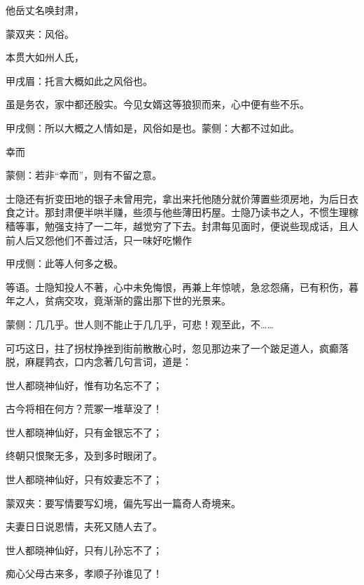 \begin{parag}
    他岳丈名唤封肃，\begin{note}蒙双夹：风俗。\end{note}本贯大如州人氏，\begin{note}甲戌眉：托言大概如此之风俗也。\end{note}虽是务农，家中都还殷实。今见女婿这等狼狈而来，心中便有些不乐。\begin{note}甲戌侧：所以大概之人情如是，风俗如是也。蒙侧：大都不过如此。\end{note}幸而\begin{note}蒙侧：若非“幸而”，则有不留之意。\end{note}士隐还有折变田地的银子未曾用完，拿出来托他随分就价薄置些须房地，为后日衣食之计。那封肃便半哄半赚，些须与他些薄田朽屋。士隐乃读书之人，不惯生理稼穑等事，勉强支持了一二年，越觉穷了下去。封肃每见面时，便说些现成话，且人前人后又怨他们不善过活，只一味好吃懒作\begin{note}甲戌侧：此等人何多之极。\end{note}等语。士隐知投人不著，心中未免悔恨，再兼上年惊唬，急忿怨痛，已有积伤，暮年之人，贫病交攻，竟渐渐的露出那下世的光景来。\begin{note}蒙侧：几几乎。世人则不能止于几几乎，可悲！观至此，不……\end{note}
\end{parag}


\begin{parag}
    可巧这日，拄了拐杖挣挫到街前散散心时，忽见那边来了一个跛足道人，疯癫落脱，麻屣鹑衣，口内念著几句言词，道是：
\end{parag}


\begin{poem}
    \begin{pl}世人都晓神仙好，惟有功名忘不了；\end{pl}

    \begin{pl}古今将相在何方？荒冢一堆草没了！\end{pl}

    \begin{pl}世人都晓神仙好，只有金银忘不了；\end{pl}

    \begin{pl}终朝只恨聚无多，及到多时眼闭了。\end{pl}

    \begin{pl}世人都晓神仙好，只有姣妻忘不了；\end{pl}
    \begin{note}蒙双夹：要写情要写幻境，偏先写出一篇奇人奇境来。\end{note}

    \begin{pl}夫妻日日说恩情，夫死又随人去了。\end{pl}

    \begin{pl}世人都晓神仙好，只有儿孙忘不了；\end{pl}

    \begin{pl}痴心父母古来多，孝顺子孙谁见了！\end{pl}
\end{poem}


